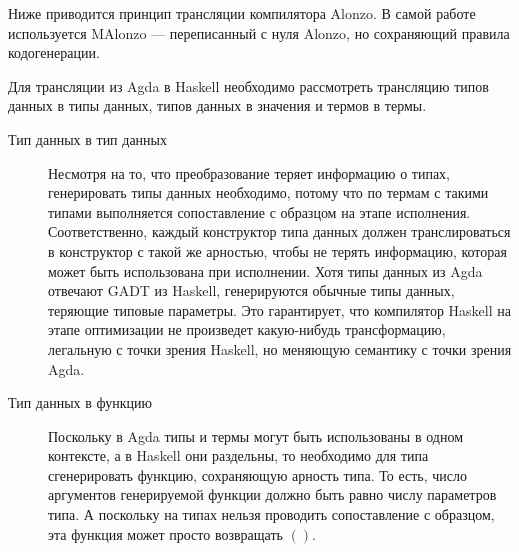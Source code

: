 Ниже приводится принцип трансляции компилятора Alonzo\cite{Ben07}. В самой работе используется
MAlonzo --- переписанный с нуля Alonzo, но сохраняющий правила кодогенерации.

Для трансляции из Agda в Haskell необходимо рассмотреть трансляцию типов данных в типы данных,
типов данных в значения и термов в термы.

\begin{description}
\item[Тип данных в тип данных]
   Несмотря на то, что преобразование теряет информацию о типах, генерировать типы данных необходимо,
   потому что по термам с такими типами выполняется сопоставление с образцом на этапе исполнения.
   Соответственно, каждый конструктор типа данных должен транслироваться в конструктор с такой же
   арностью, чтобы не терять информацию, которая может быть использована при исполнении. Хотя типы
   данных из Agda отвечают GADT из Haskell, генерируются обычные типы данных, теряющие типовые параметры.
   Это гарантирует, что компилятор Haskell на этапе оптимизации не произведет какую-нибудь трансформацию,
   легальную с точки зрения Haskell, но меняющую семантику с точки зрения Agda.
\item[Тип данных в функцию]
   Поскольку в Agda типы и термы могут быть использованы в одном контексте, а в Haskell они раздельны,
   то необходимо для типа сгенерировать функцию, сохраняющую арность типа. То есть, число аргументов
   генерируемой функции должно быть равно числу параметров типа. А поскольку на типах нельзя
   проводить сопоставление с образцом, эта функция может просто возвращать \(()\).
\end{description}
